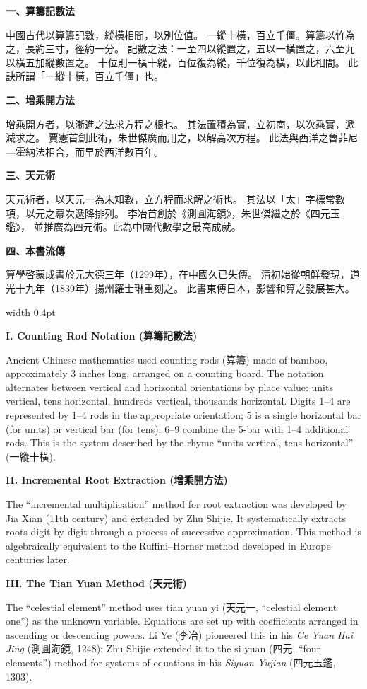 \documentclass[10pt,a4paper]{article}
\newlength{\cnwidth}
\newlength{\enwidth}
\newcommand{\bilingual}[2]{%
  \noindent%
  \begin{minipage}[t]{\cnwidth}%
    #1%
  \end{minipage}%
  \hfill\vrule width 0.4pt\hfill%
  \begin{minipage}[t]{\enwidth}%
    #2%
  \end{minipage}%
  \par\smallskip%
}
\begin{document}
\bilingual{%
  \textbf{一、算籌記數法}

  中國古代以算籌記數，縱橫相間，以別位值。
  一縱十橫，百立千僵。算籌以竹為之，長約三寸，徑約一分。
  記數之法：一至四以縱置之，五以一橫置之，六至九以橫五加縱數置之。
  十位則一橫十縱，百位復為縱，千位復為橫，以此相間。
  此訣所謂「一縱十橫，百立千僵」也。

  \smallskip
  \textbf{二、增乘開方法}

  增乘開方者，以漸進之法求方程之根也。
  其法置積為實，立初商，以次乘實，遞減求之。
  賈憲首創此術，朱世傑廣而用之，以解高次方程。
  此法與西洋之魯菲尼—霍納法相合，而早於西洋數百年。

  \smallskip
  \textbf{三、天元術}

  天元術者，以天元一為未知數，立方程而求解之術也。
  其法以「太」字標常數項，以元之冪次遞降排列。
  李冶首創於《測圓海鏡》，朱世傑繼之於《四元玉鑑》，
  並推廣為四元術。此為中國代數學之最高成就。

  \smallskip
  \textbf{四、本書流傳}

  算學啓蒙成書於元大德三年（1299年），在中國久已失傳。
  清初始從朝鮮發現，道光十九年（1839年）揚州羅士琳重刻之。
  此書東傳日本，影響和算之發展甚大。
}{%
  \textbf{I. Counting Rod Notation (算籌記數法)}

  Ancient Chinese mathematics used counting rods (算籌) made of bamboo,
  approximately 3 inches long, arranged on a counting board. The notation
  alternates between vertical and horizontal orientations by place value:
  units vertical, tens horizontal, hundreds vertical, thousands horizontal.
  Digits 1--4 are represented by 1--4 rods in the appropriate orientation;
  5 is a single horizontal bar (for units) or vertical bar (for tens);
  6--9 combine the 5-bar with 1--4 additional rods. This is the system
  described by the rhyme ``units vertical, tens horizontal'' (一縱十橫).

  \smallskip
  \textbf{II. Incremental Root Extraction (增乘開方法)}

  The ``incremental multiplication'' method for root extraction was developed
  by Jia Xian (11th century) and extended by Zhu Shijie. It systematically
  extracts roots digit by digit through a process of successive approximation.
  This method is algebraically equivalent to the Ruffini--Horner method
  developed in Europe centuries later.

  \smallskip
  \textbf{III. The Tian Yuan Method (天元術)}

  The ``celestial element'' method uses tian yuan yi (天元一, ``celestial element one'')
  as the unknown variable. Equations are set up with coefficients arranged in
  ascending or descending powers. Li Ye (李冶) pioneered this in his
  \textit{Ce Yuan Hai Jing} (測圓海鏡, 1248); Zhu Shijie extended it to
  the si yuan (四元, ``four elements'') method for systems of equations
  in his \textit{Siyuan Yujian} (四元玉鑑, 1303).

}
\end{document}
